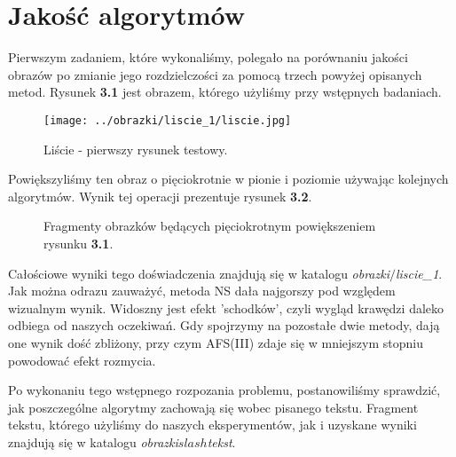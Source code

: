 \section{Jakość algorytmów}
Pierwszym zadaniem, które wykonaliśmy, polegało na porównaniu jakości obrazów po
zmianie jego rozdzielczości za pomocą trzech powyżej opisanych metod. Rysunek
\textbf{3.1} jest obrazem, którego użyliśmy przy wstępnych badaniach.
\begin{figure}[h!tb]
\begin{center}
\texttt{[image: ../obrazki/liscie\_1/liscie.jpg]}
\caption{Liście - pierwszy rysunek testowy.}
\end{center}
\end{figure}

Powiększyliśmy ten obraz o pięciokrotnie w pionie i poziomie używając
kolejnych algorytmów. Wynik tej operacji prezentuje rysunek \textbf{3.2}.
\begin{figure}[h!tb]
\begin{center}
\caption{Fragmenty obrazków będących pięciokrotnym powiększeniem rysunku \textbf{3.1}.}
\end{center}
\end{figure}

Całościowe wyniki tego doświadczenia znajdują się w katalogu \textit{obrazki$\slash$liscie\_1}. Jak można odrazu zauważyć, metoda NS dała najgorszy pod względem wizualnym wynik.
Widoszny jest efekt 'schodków', czyli wygląd krawędzi daleko odbiega od naszych
oczekiwań. Gdy spojrzymy na pozostałe dwie metody, dają one wynik dość zbliżony,
przy czym AFS(III) zdaje się w mniejszym stopniu powodować efekt rozmycia.

Po wykonaniu tego wstępnego rozpozania problemu, postanowiliśmy sprawdzić, jak
poszczególne algorytmy zachowają się wobec pisanego tekstu.
Fragment tekstu, którego użyliśmy do naszych eksperymentów, jak i uzyskane wyniki znajdują się w katalogu \textit{obrazki$slash$tekst}.

